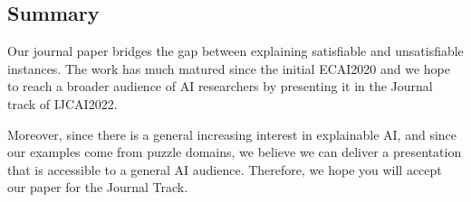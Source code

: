 \documentclass[11pt,a4paper]{article}
\begin{document}
	\subsection*{Summary}
	Our journal paper bridges the gap between explaining satisfiable and unsatisfiable instances. The work has much matured since the initial ECAI2020 and we hope to reach a broader audience of AI researchers by presenting it in the Journal track of IJCAI2022.
	
	Moreover, since there is a general increasing interest in explainable AI, and since our examples come from puzzle domains, we believe we can deliver a presentation that is accessible to a general AI audience. Therefore, we hope you will accept our paper for the Journal Track.
	
	






\end{document}
